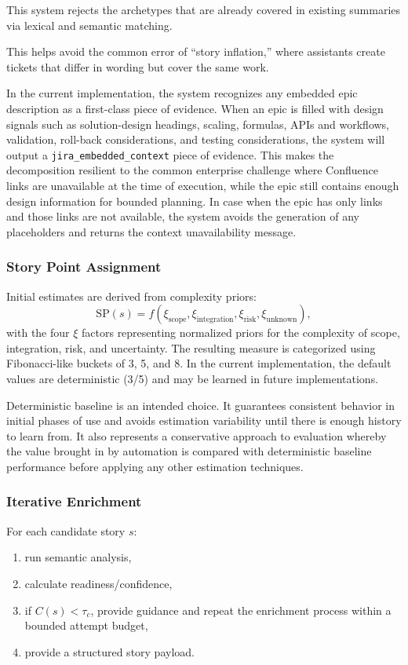 \documentclass[manuscript,review]{acmart}
\begin{document}
This system rejects the archetypes that are already covered in existing summaries via lexical and semantic matching.

This helps avoid the common error of ``story inflation,'' where assistants create tickets that differ in wording but cover the same work.

In the current implementation, the system recognizes any embedded epic description as a first-class piece of evidence. When an epic is filled with design signals such as solution-design headings, scaling, formulas, APIs and workflows, validation, roll-back considerations, and testing considerations, the system will output a \texttt{jira\_embedded\_context} piece of evidence. This makes the decomposition resilient to the common enterprise challenge where Confluence links are unavailable at the time of execution, while the epic still contains enough design information for bounded planning. In case when the epic has only links and those links are not available, the system avoids the generation of any placeholders and returns the context unavailability message.

\subsubsection{Story Point Assignment}
Initial estimates are derived from complexity priors:
\begin{equation}
\mathrm{SP}(s) = f(\xi_{\text{scope}}, \xi_{\text{integration}}, \xi_{\text{risk}}, \xi_{\text{unknown}}),
\end{equation}
with the four $\xi$ factors representing normalized priors for the complexity of scope, integration, risk, and uncertainty. The resulting measure is categorized using Fibonacci-like buckets of 3, 5, and 8. In the current implementation, the default values are deterministic (3/5) and may be learned in future implementations.

Deterministic baseline is an intended choice. It guarantees consistent behavior in initial phases of use and avoids estimation variability until there is enough history to learn from. It also represents a conservative approach to evaluation whereby the value brought in by automation is compared with deterministic baseline performance before applying any other estimation techniques.

\subsubsection{Iterative Enrichment}
For each candidate story $s$:
\begin{enumerate}
  \item run semantic analysis,
  \item calculate readiness/confidence,
  \item if $C(s)<\tau_c$, provide guidance and repeat the enrichment process within a bounded attempt budget,
  \item provide a structured story payload.
\end{enumerate}
\end{document}
